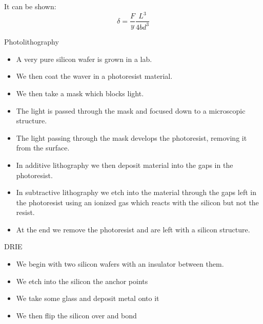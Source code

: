 \documentclass{report}
\begin{document}
\begin{description}
\begin{mdframed}
            It can be shown: 
            \begin{displaymath}
                \delta = \frac{F}{y} \frac{L^3}{4bd^3}
            \end{displaymath}
        \end{mdframed}
    \item {\large Photolithography}
        \begin{mdframed}
            \begin{itemize}
                \item A very pure silicon wafer is grown in a
                    lab.
                \item We then coat the waver in a photoresist
                    material.
                \item We then take a mask which blocks light.
                \item The light is passed through the mask
                    and focused down to a microscopic structure.
                \item The light passing through the mask develops
                    the photoresist, removing it from the surface.
                \item In additive lithography we then deposit
                    material into the gaps in the photoresist.
                \item In subtractive lithography we etch into
                    the material through the gaps left in the
                    photoresist using an ionized gas which
                    reacts with the silicon but not the
                    resist.
                \item At the end we remove the photoresist and are
                    left with a silicon structure.
            \end{itemize}
        \end{mdframed}
        \pagebreak
    \item {\large DRIE}
        \begin{mdframed}
            \begin{itemize}
                \item 
                    We begin with two silicon wafers with an
                    insulator between them.
                \item We etch into the silicon the anchor points
                \item We take some glass and deposit metal
                    onto it
                \item We then flip the silicon over and bond

\end{itemize}
\end{mdframed}
\end{description}
\end{document}
